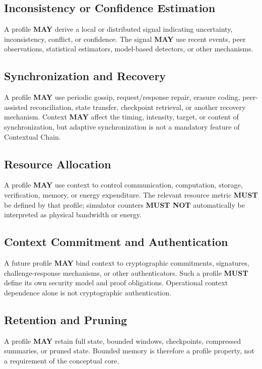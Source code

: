 \documentclass[11pt]{article}
\begin{document}
\subsection{Inconsistency or Confidence Estimation}
A profile \textbf{MAY} derive a local or distributed signal indicating uncertainty, inconsistency,
conflict, or confidence. The signal \textbf{MAY} use recent events, peer observations, statistical
estimators, model-based detectors, or other mechanisms.

\subsection{Synchronization and Recovery}
A profile \textbf{MAY} use periodic gossip, request/response repair, erasure coding, peer-assisted
reconciliation, state transfer, checkpoint retrieval, or another recovery mechanism. Context
\textbf{MAY} affect the timing, intensity, target, or content of synchronization, but adaptive
synchronization is not a mandatory feature of Contextual Chain.

\subsection{Resource Allocation}
A profile \textbf{MAY} use context to control communication, computation, storage, verification,
memory, or energy expenditure. The relevant resource metric \textbf{MUST} be defined by that
profile; simulator counters \textbf{MUST NOT} automatically be interpreted as physical bandwidth
or energy.

\subsection{Context Commitment and Authentication}
A future profile \textbf{MAY} bind context to cryptographic commitments, signatures,
challenge-response mechanisms, or other authenticators. Such a profile \textbf{MUST} define its
own security model and proof obligations. Operational context dependence alone is not
cryptographic authentication.

\subsection{Retention and Pruning}
A profile \textbf{MAY} retain full state, bounded windows, checkpoints, compressed summaries, or
pruned state. Bounded memory is therefore a profile property, not a requirement of the
conceptual core.
\end{document}
